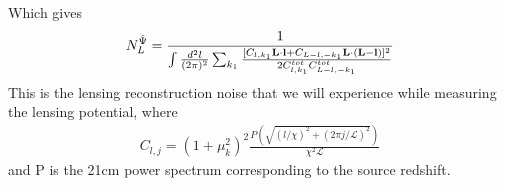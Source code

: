 \documentclass[12pt]{article}
\newcommand{\beq}{\begin{equation}}
\newcommand{\eeq}{\end{equation}}
\newcommand{\beqal}{\begin{aligned}}
\newcommand{\eeqal}{\end{aligned}}
\def\l{{\bf l}}
\def\L{{\bf L}}
\numberwithin{equation}{section}
\begin{document}
Which gives
\beq
\beqal
N_L^{\hat{\Psi}} = \frac{1}{{\int \frac{d^2 l}{(2\pi)^2} \sum_{k_1} \frac{[C_{l,k_1} \L\cdot \l +
			C_{L-l,-k_1} \L\cdot (\L-\l)]^2}{2C^{tot}_{l,k_1}C^{tot}_{L-l,-k_1}} }} \label{eq:lensing_potential_reconsruction_noise}
\eeqal
\eeq
This is the lensing reconstruction noise that we will experience while measuring the lensing potential,
%
%
where
\begin{eqnarray}
C_{l,j} = (1 + \mu_k^2)^2 \frac{P(\sqrt{(l/\chi)^2 + (2 \pi j/\mathcal{L})^2})}{\chi^2 \mathcal{L}}
\end{eqnarray}
and P is the 21cm power spectrum corresponding to the source redshift.
\end{document}
